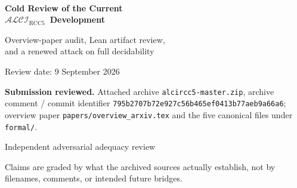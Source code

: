 \documentclass[11pt]{article}
\newcommand{\Logic}{\ensuremath{\mathcal{ALCI}_{\mathrm{RCC5}}}}
\newcommand{\code}[1]{\texttt{#1}}
\begin{document}

\begin{titlepage}
  \color{ink}
  \vspace*{0.5in}
  \noindent{\color{teal}\rule{\linewidth}{2.4pt}}\\[0.35in]
  {\Huge\bfseries\color{navy} Cold Review of the Current\\[0.12in]
  \Logic\ Development}\par
  \vspace{0.22in}
  {\Large Overview-paper audit, Lean artifact review,\\
  and a renewed attack on full decidability}\par
  \vspace{0.34in}
  {\large Review date: 9 September 2026}\par
  \vspace{0.5in}

  \begin{tcolorbox}[colback=mist,colframe=navy,boxrule=0.9pt,arc=2pt,
    before upper=\raggedright]
  \textbf{Submission reviewed.} Attached archive \code{alcircc5-master.zip},
  archive comment / commit identifier
  \code{795b2707b72e927c56b465ef0413b77aeb9a66a6}; overview paper
  \code{papers/overview\_arxiv.tex} and the five canonical files under
  \code{formal/}.
  \end{tcolorbox}

  \vfill
  {\large Independent adversarial adequacy review}\par
  \vspace{0.08in}
  {\small Claims are graded by what the archived sources actually establish,
  not by filenames, comments, or intended future bridges.}\par
  \vspace{0.25in}
  \noindent{\color{teal}\rule{\linewidth}{2.4pt}}
\end{titlepage}
\clearpage
{}
\end{document}
